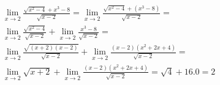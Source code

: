 \begin{ex}
\begin{align}
&\lim_{x\rightarrow 2} \frac{\sqrt{x^2-4}+x^3-8}{\sqrt{x-2}}=\lim_{x\rightarrow 2} \frac{\sqrt{x^2-4}+(x^3-8)}{\sqrt{x-2}}=\nonumber\\
&\lim_{x\rightarrow 2} \frac{\sqrt{x^2-4}}{\sqrt{x-2}}+\lim_{x\rightarrow 2} \frac{x^3-8}{\sqrt{x-2}}=\nonumber\\
&\lim_{x\rightarrow 2} \frac{\sqrt{(x+2)(x-2)}}{\sqrt{x-2}}+\lim_{x\rightarrow 2} \frac{(x-2)(x^2+2x+4)}{\sqrt{x-2}}=\nonumber\\
&\lim_{x\rightarrow 2} \sqrt{x+2}+\lim_{x\rightarrow 2} \frac{(x-2)(x^2+2x+4)}{\sqrt{x-2}}=\sqrt{4}+16.0=2\nonumber
\end{align}
\end{ex}
